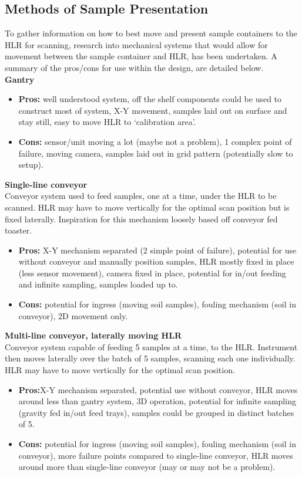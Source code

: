\documentclass{UoNMCHA}
\numberwithin{equation}{section}
\begin{document}
\subsection{Methods of Sample Presentation}
To gather information on how to best move and present sample containers to the HLR for scanning, research into mechanical systems that would allow for movement between the sample container and HLR, has been undertaken. A summary of the pros/cons for use within the design, are detailed below.\\
\textbf{Gantry}\\
\begin{itemize}
	\item \textbf{ Pros:} well understood system, off the shelf components could be used to construct most of system, X-Y movement, samples laid out on surface and stay still, easy to move HLR to ‘calibration area’. 
	\item \textbf{ Cons:} sensor/unit moving a lot (maybe not a problem), 1 complex point of failure, moving camera, samples laid out in grid pattern (potentially slow to setup). 
\end{itemize}
\textbf{Single-line conveyor}\\
Conveyor system used to feed samples, one at a time, under the HLR to be scanned. HLR may have to move vertically for the optimal scan position but is fixed laterally. Inspiration for this mechanism loosely based off conveyor fed toaster. 
\begin{itemize}
	\item \textbf{ Pros:} X-Y mechanism separated (2 simple point of failure), potential for use without conveyor and manually position samples, HLR mostly fixed in place (less sensor movement), camera fixed in place, potential for in/out feeding and infinite sampling, samples loaded up to.
	\item \textbf{ Cons:} potential for ingress (moving soil samples), fouling mechanism (soil in conveyor), 2D movement only.
\end{itemize}
\textbf{ Multi-line conveyor, laterally moving HLR}\\
Conveyor system capable of feeding 5 samples at a time, to the HLR. Instrument then moves laterally over the batch of 5 samples, scanning each one individually. HLR may have to move vertically for the optimal scan position. \\
\begin{itemize}
	\item \textbf{ Pros:}X-Y mechanism separated, potential use without conveyor, HLR moves around less than gantry system, 3D operation, potential for infinite sampling (gravity fed in/out feed trays), samples could be grouped in distinct batches of 5.
	\item \textbf{ Cons:} potential for ingress (moving soil samples), fouling mechanism (soil in conveyor), more failure points compared to single-line conveyor, HLR moves around more than single-line conveyor (may or may not be a problem).
\end{itemize}
\end{document}
